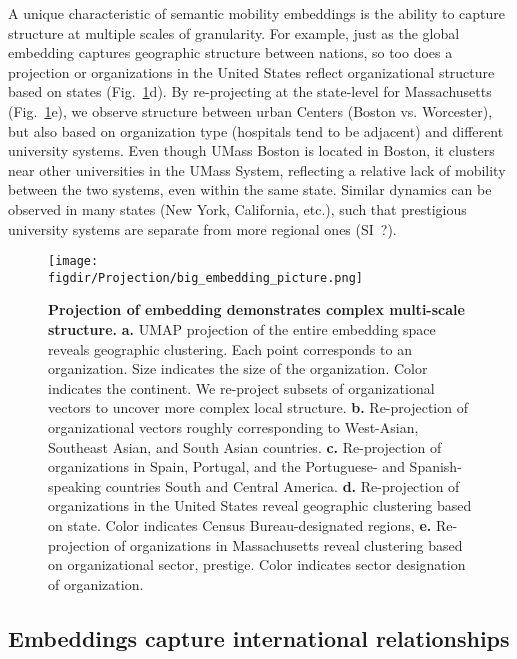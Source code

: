 \documentclass[12pt]{article} %
\def\figdir{../Figs}
\begin{document}
A unique characteristic of semantic mobility embeddings is the ability to capture structure at multiple scales of granularity.
For example, just as the global embedding captures geographic structure between nations, so too does a projection or organizations in the United States reflect organizational structure based on states (Fig.~\ref{fig:projection}d). 
By re-projecting at the state-level for Massachusetts (Fig.~\ref{fig:projection}e), we observe structure between urban Centers (Boston vs. Worcester), but also based on organization type (hospitals tend to be adjacent) and different university systems. Even though UMass Boston is located in Boston, it clusters near other universities in the UMass System, reflecting a relative lack of mobility between the two systems, even within the same state. 
Similar dynamics can be observed in many states (New York, California, etc.), such that prestigious university systems are separate from more regional ones (SI~?).

\begin{figure}[hp!]
	\centering
	\texttt{[image: \\figdir/Projection/big\_embedding\_picture.png]}
	\caption{
		\textbf{Projection of embedding demonstrates complex multi-scale structure.}
		\textbf{a.}
		UMAP projection \autocite{mcinnes2018umap} of the entire embedding space reveals geographic clustering.
		Each point corresponds to an organization. 
		Size indicates the size of the organization.
		Color indicates the continent. 
		We re-project subsets of organizational vectors to uncover more complex local structure.
		\textbf{b.} Re-projection of organizational vectors roughly corresponding to West-Asian, Southeast Asian, and South Asian countries. 
		\textbf{c.} Re-projection of organizations in Spain, Portugal, and the Portuguese- and Spanish-speaking countries South and Central America. 
		\textbf{d.} Re-projection of organizations in the United States reveal geographic clustering based on state.
		Color indicates Census Bureau-designated regions,
		\textbf{e.} Re-projection of organizations in Massachusetts reveal clustering based on organizational sector, prestige. 
		Color indicates sector designation of organization. 
	}
	\label{fig:projection}
\end{figure}


\subsection*{Embeddings capture international relationships}
\end{document}
